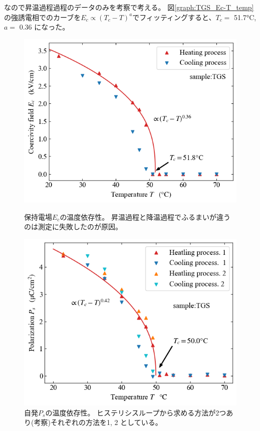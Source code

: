 \documentclass[11pt,dvipdfmx,a4paper]{jsarticle}
\begin{document}
なので昇温過程過程のデータのみを考察で考える。
図\ref{graph:TGS_Ec-T_temp}の強誘電相でのカーブを\(E_c\propto(T_c-T)^a\)でフィッティングすると、\(T_c =\) 51.7\si{\degreeCelsius},
\(a =\) 0.36 になった。
\begin{figure}[H]
    \begin{minipage}[t]{0.48\columnwidth}
        \centering
        \includegraphics[width=\columnwidth]{TGS_Ec-T.png}
        \caption{\small{保持電場\(E_c\)の温度依存性。
        昇温過程と降温過程でふるまいが違うのは測定に失敗したのが原因。}}
        \label{graph:TGS_Ec-T_temp}
    \end{minipage}
    \hfill
    \begin{minipage}[t]{0.48\columnwidth}
        \centering
        \includegraphics[width=\columnwidth]{TGS_Ps-T.png}
        \caption{\small{自発\(P_s\)の温度依存性。
        ヒステリシスループから求める方法が2つあり(考察)それぞれの方法を1, 2 としている。}}
        \label{graph:TGS_Ps-T}
    \end{minipage}
\end{figure}
\end{document}
